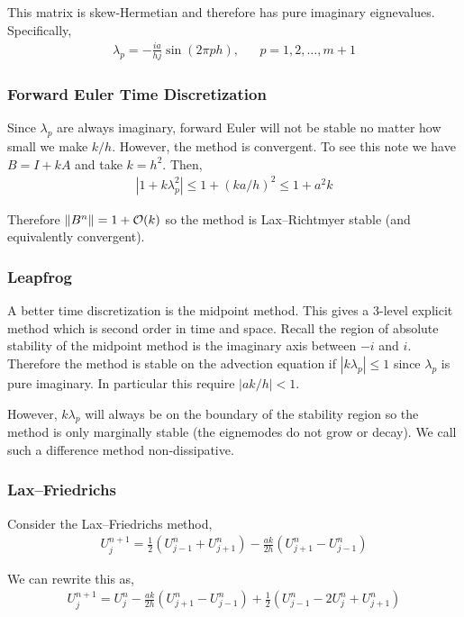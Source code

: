 \documentclass[12pt]{article}
\begin{document}
This matrix is skew-Hermetian and therefore has pure imaginary eignevalues. Specifically,
\begin{align*}
    \lambda_p = -\frac{ia}{hj}\sin(2\pi p h), && p=1,2,\ldots,m+1
\end{align*}

\subsubsection{Forward Euler Time Discretization}
Since \( \lambda_p \) are always imaginary, forward Euler will not be stable no matter how small we make \( k/h \). However, the method is convergent. To see this note we have \( B = I+kA \) and take \( k=h^2 \). Then,
\begin{align*}
    |1+k\lambda_p^2| \leq 1+(ka/h)^2 \leq 1 +a^2k
\end{align*}

Therefore \( \left\lVert B^n\right\rVert = 1+\mathcal{O}(k) \) so the method is Lax--Richtmyer stable (and equivalently convergent).

\subsubsection{Leapfrog}
A better time discretization is the midpoint method. This gives a 3-level explicit method which is second order in time and space. Recall the region of absolute stability of the midpoint method is the imaginary axis between \( -i \) and \( i \). Therefore the method is stable on the advection equation if \( |k\lambda_p| \leq 1 \) since \( \lambda_p \) is pure imaginary. In particular this require \( |ak/h| < 1 \).

However, \( k\lambda_p \) will always be on the boundary of the stability region so the method is only marginally stable (the eignemodes do not grow or decay). We call such a difference method non-dissipative.

\subsubsection{Lax--Friedrichs}
Consider the Lax--Friedrichs method,
\begin{align*}
    U_j^{n+1} = \frac{1}{2} \left( U_{j-1}^n + U_{j+1}^n \right) - \frac{ak}{2h}(U_{j+1}^n - U_{j-1}^n)
\end{align*}

We can rewrite this as,
\begin{align*}
    U_j^{n+1} = U_j^n - \frac{ak}{2h}(U_{j+1}^n-U_{j-1}^n) + \frac{1}{2} (U_{j-1}^n  -2U_j^n+U_{j+1}^n)
\end{align*}
\end{document}
